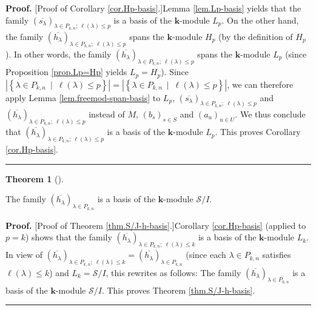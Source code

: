 \documentclass[numbers=enddot,12pt,final,onecolumn,notitlepage]{scrartcl}%
\theoremstyle{definition}
\newtheorem{theo}{Theorem}[section]
\newenvironment{theorem}[1][]
{\begin{theo}[#1]\begin{leftbar}}
{\end{leftbar}\end{theo}}
\newenvironment{proof}[1][Proof]{\noindent\textbf{#1.} }{\ \rule{0.5em}{0.5em}}
\begin{document}
\begin{proof}
[Proof of Corollary \ref{cor.Hp-basis}.]Lemma \ref{lem.Lp-basis} yields that
the family $\left(  \overline{s_{\lambda}}\right)  _{\lambda\in P_{k,n}%
;\ \ell\left(  \lambda\right)  \leq p}$ is a basis of the $\mathbf{k}$-module
$L_{p}$. On the other hand, the family $\left(  \overline{h_{\lambda}}\right)
_{\lambda\in P_{k,n};\ \ell\left(  \lambda\right)  \leq p}$ spans the
$\mathbf{k}$-module $H_{p}$ (by the definition of $H_{p}$). In other words,
the family $\left(  \overline{h_{\lambda}}\right)  _{\lambda\in P_{k,n}%
;\ \ell\left(  \lambda\right)  \leq p}$ spans the $\mathbf{k}$-module $L_{p}$
(since Proposition \ref{prop.Lp=Hp} yields $L_{p}=H_{p}$). Since $\left\vert
\left\{  \lambda\in P_{k,n}\ \mid\ \ell\left(  \lambda\right)  \leq p\right\}
\right\vert =\left\vert \left\{  \lambda\in P_{k,n}\ \mid\ \ell\left(
\lambda\right)  \leq p\right\}  \right\vert $, we can therefore apply Lemma
\ref{lem.freemod-span-basis} to $L_{p}$, $\left(  \overline{s_{\lambda}%
}\right)  _{\lambda\in P_{k,n};\ \ell\left(  \lambda\right)  \leq p}$ and
$\left(  \overline{h_{\lambda}}\right)  _{\lambda\in P_{k,n};\ \ell\left(
\lambda\right)  \leq p}$ instead of $M$, $\left(  b_{s}\right)  _{s\in S}$ and
$\left(  a_{u}\right)  _{u\in U}$. We thus conclude that $\left(
\overline{h_{\lambda}}\right)  _{\lambda\in P_{k,n};\ \ell\left(
\lambda\right)  \leq p}$ is a basis of the $\mathbf{k}$-module $L_{p}$. This
proves Corollary \ref{cor.Hp-basis}.
\end{proof}

\begin{theorem}
\label{thm.S/J-h-basis}The family $\left(  \overline{h_{\lambda}}\right)
_{\lambda\in P_{k,n}}$ is a basis of the $\mathbf{k}$-module $\mathcal{S}/I$.
\end{theorem}

\begin{proof}
[Proof of Theorem \ref{thm.S/J-h-basis}.]Corollary \ref{cor.Hp-basis} (applied
to $p=k$) shows that the family $\left(  \overline{h_{\lambda}}\right)
_{\lambda\in P_{k,n};\ \ell\left(  \lambda\right)  \leq k}$ is a basis of the
$\mathbf{k}$-module $L_{k}$. In view of $\left(  \overline{h_{\lambda}%
}\right)  _{\lambda\in P_{k,n};\ \ell\left(  \lambda\right)  \leq k}=\left(
\overline{h_{\lambda}}\right)  _{\lambda\in P_{k,n}}$ (since each $\lambda\in
P_{k,n}$ satisfies $\ell\left(  \lambda\right)  \leq k$) and $L_{k}%
=\mathcal{S}/I$, this rewrites as follows: The family $\left(  \overline
{h_{\lambda}}\right)  _{\lambda\in P_{k,n}}$ is a basis of the $\mathbf{k}%
$-module $\mathcal{S}/I$. This proves Theorem \ref{thm.S/J-h-basis}.
\end{proof}
\end{document}
